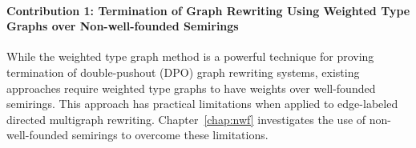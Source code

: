 \begin{itemize}
\end{itemize}

\paragraph{Contribution 1: Termination of Graph Rewriting Using Weighted Type Graphs over Non-well-founded Semirings}
While the weighted type graph method is a powerful technique for proving termination of double-pushout (DPO) graph rewriting systems, existing approaches require weighted type graphs to have weights over well-founded semirings. This approach has practical limitations when applied to edge-labeled directed multigraph rewriting. Chapter~\ref{chap:nwf} investigates the use of non-well-founded semirings to overcome these limitations. 
 
